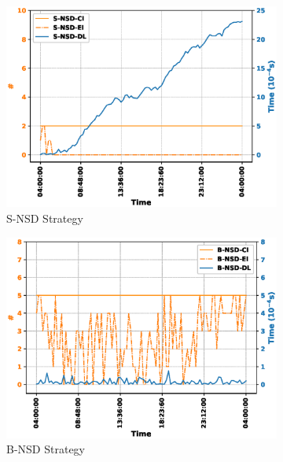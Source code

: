 \documentclass[conference, final]{IEEEtran}
\begin{document}
{\begin{figure}
\begin{subfigure}[h]{0.32\linewidth}
\includegraphics[width=\linewidth]{./figures/S-NSDinstance_trace.eps}
\caption{{\textsf{S-NSD}} Strategy}
\end{subfigure}
\hfill
\begin{subfigure}[h]{0.32\linewidth}
\includegraphics[width=\linewidth]{./figures/B-NSDinstance_trace.eps}
\caption{{\textsf{B-NSD}} Strategy}
\end{subfigure}
\hfill
\begin{subfigure}[h]{0.32\linewidth}

\end{subfigure}
\end{figure}}
\end{document}

